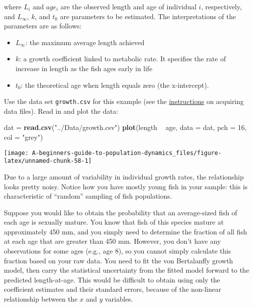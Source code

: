\documentclass[]{book}
\newenvironment{Shaded}{\begin{snugshade}}{\end{snugshade}}
\newcommand{\DataTypeTok}[1]{\textcolor[rgb]{0.13,0.29,0.53}{#1}}
\newcommand{\DecValTok}[1]{\textcolor[rgb]{0.00,0.00,0.81}{#1}}
\newcommand{\KeywordTok}[1]{\textcolor[rgb]{0.13,0.29,0.53}{\textbf{#1}}}
\newcommand{\NormalTok}[1]{#1}
\newcommand{\OperatorTok}[1]{\textcolor[rgb]{0.81,0.36,0.00}{\textbf{#1}}}
\newcommand{\StringTok}[1]{\textcolor[rgb]{0.31,0.60,0.02}{#1}}
\providecommand{\tightlist}{%
  \setlength{\itemsep}{0pt}\setlength{\parskip}{0pt}}
\begin{document}
where \(L_i\) and \(age_i\) are the observed length and age of individual \(i\), respectively, and \(L_{\infty}\), \(k\), and \(t_0\) are parameters to be estimated. The interpretations of the parameters are as follows:

\begin{itemize}
\tightlist
\item
  \(L_{\infty}\): the maximum average length achieved
\item
  \(k\): a growth coefficient linked to metabolic rate. It specifies the rate of increase in length as the fish ages early in life
\item
  \(t_0\): the theoretical age when length equals zero (the x-intercept).
\end{itemize}

Use the data set \texttt{growth.csv} for this example (see the \protect\hyperlink{data-sets}{instructions} on acquiring data files). Read in and plot the data:

\begin{Shaded}
\begin{Highlighting}[]
\NormalTok{dat =}\StringTok{ }\KeywordTok{read.csv}\NormalTok{(}\StringTok{"../Data/growth.csv"}\NormalTok{)}
\KeywordTok{plot}\NormalTok{(length }\OperatorTok{~}\StringTok{ }\NormalTok{age, }\DataTypeTok{data =}\NormalTok{ dat, }\DataTypeTok{pch =} \DecValTok{16}\NormalTok{, }\DataTypeTok{col =} \StringTok{"grey"}\NormalTok{)}
\end{Highlighting}
\end{Shaded}

\begin{center}\texttt{[image: A-beginners-guide-to-population-dynamics\_files/figure-latex/unnamed-chunk-58-1]} \end{center}

Due to a large amount of variability in individual growth rates, the relationship looks pretty noisy. Notice how you have mostly young fish in your sample: this is characteristic of ``random'' sampling of fish populations.

Suppose you would like to obtain the probability that an average-sized fish of each age is sexually mature. You know that fish of this species mature at approximately 450 mm, and you simply need to determine the fraction of all fish at each age that are greater than 450 mm. However, you don't have any observations for some ages (e.g., age 8), so you cannot simply calculate this fraction based on your raw data. You need to fit the von Bertalanffy growth model, then carry the statistical uncertainty from the fitted model forward to the predicted length-at-age. This would be difficult to obtain using only the coefficient estimates and their standard errors, because of the non-linear relationship between the \(x\) and \(y\) variables.
\end{document}
